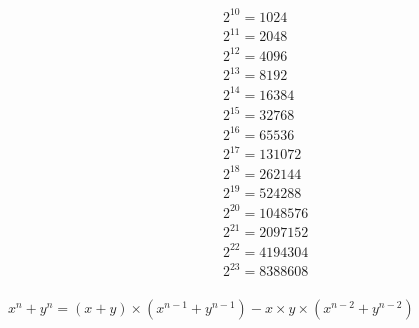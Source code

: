 \begin{align*}
& 2^10=1024 \\
& 2^11=2048 \\
& 2^12=4096 \\
& 2^13=8192 \\
& 2^14=16384 \\
& 2^15=32768 \\
& 2^16=65536 \\
& 2^17=131072 \\
& 2^18=262144 \\
& 2^19=524288 \\
& 2^20=1048576 \\
& 2^21=2097152 \\
& 2^22=4194304 \\
& 2^23=8388608 \\
\end{align*}

$x^n+y^n=(x+y) \times (x^{n-1}+y^{n-1})-x \times y\times (x^{n-2}+y^{n-2})$

